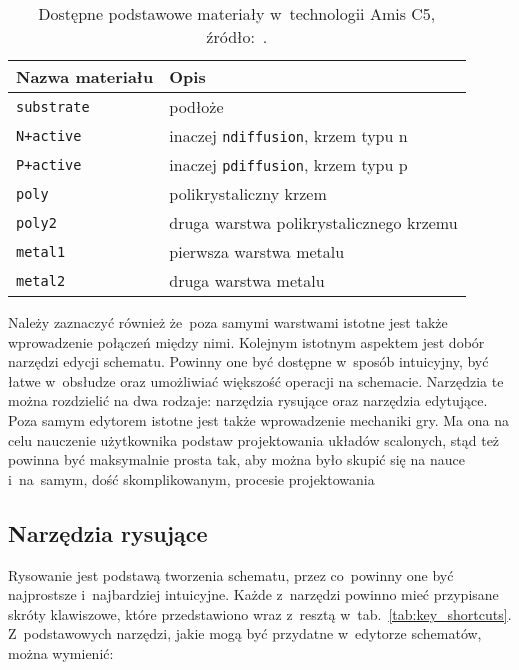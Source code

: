 \newpage
\begin{table}[h]
    \centering
    \caption[Dostępne materiały w~technologii Amis C5.]
    {Dostępne podstawowe materiały w~technologii Amis C5, źródło:~\cite{amis_params}.}
    \label{tab:amis_materials}
    \begin{tabular}{|l|l|}
        \hline
        Nazwa materiału & Opis \\
        \hline
        \hline
        \texttt{substrate} & podłoże \\
        \hline
        \texttt{N+active} & inaczej \texttt{ndiffusion}, krzem typu n\\
        \hline
        \texttt{P+active} & inaczej \texttt{pdiffusion}, krzem typu p\\
        \hline
        \texttt{poly} & polikrystaliczny krzem \\
        \hline
        \texttt{poly2} & druga warstwa polikrystalicznego krzemu \\
        \hline
        \texttt{metal1} & pierwsza warstwa metalu \\
        \hline
        \texttt{metal2} & druga warstwa metalu \\
        \hline
    \end{tabular}
\end{table}

Należy zaznaczyć również że~poza samymi warstwami istotne jest także wprowadzenie połączeń między nimi.
Kolejnym istotnym aspektem jest dobór narzędzi edycji schematu.
Powinny one być dostępne w~sposób intuicyjny, być łatwe w~obsłudze oraz umożliwiać większość operacji na schemacie.
Narzędzia te można rozdzielić na dwa rodzaje: narzędzia rysujące oraz narzędzia edytujące. \\
\indent Poza samym edytorem istotne jest także wprowadzenie mechaniki gry.
Ma ona na celu nauczenie użytkownika podstaw projektowania układów scalonych,
stąd też powinna być maksymalnie prosta tak, aby można było skupić się na nauce i~na~samym,
dość skomplikowanym, procesie projektowania

\subsection{Narzędzia rysujące}
\label{subsec:narzedzia_rysujace}

Rysowanie jest podstawą tworzenia schematu, przez co~powinny one być najprostsze i~najbardziej intuicyjne.
Każde z~narzędzi powinno mieć przypisane skróty klawiszowe,
które przedstawiono wraz z~resztą w~tab.~\ref{tab:key_shortcuts}. %
Z~podstawowych narzędzi, jakie mogą być przydatne w~edytorze schematów, można wymienić:

